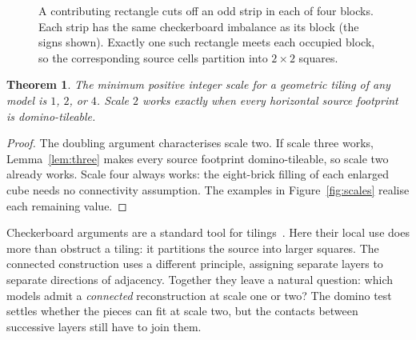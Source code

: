 \documentclass[10pt,reqno]{amsart}
\newtheorem{theorem}{Theorem}
\begin{document}
\begin{figure}[htbp]
\centering
{}
\caption{A contributing rectangle cuts off an odd strip in each of four
blocks. Each strip has the same checkerboard imbalance as its block
(the signs shown). Exactly one such rectangle meets each occupied block,
so the corresponding source cells partition into $2\times2$ squares.}
\label{fig:checkerboard}
\end{figure}

\begin{theorem}\label{thm:scales}
The minimum positive integer scale for a geometric tiling of any model
is $1$, $2$, or $4$. Scale $2$ works exactly when every horizontal
source footprint is domino-tileable.
\end{theorem}

\begin{proof}
The doubling argument characterises scale two. If scale three works,
Lemma~\ref{lem:three} makes every source footprint domino-tileable,
so scale two already works. Scale four always works: the eight-brick
filling of each enlarged cube needs no connectivity assumption.
The examples in Figure~\ref{fig:scales} realise each remaining value.
\end{proof}

Checkerboard arguments are a standard tool for tilings~\cite{Golomb1994}.
Here their local use does more than obstruct a tiling: it partitions the
source into larger squares. The connected construction uses a different
principle, assigning separate layers to separate directions of adjacency.
Together they leave a natural question: which models admit a
\emph{connected} reconstruction at scale one or two? The domino test
settles whether the pieces can fit at scale two, but the contacts between
successive layers still have to join them.
\end{document}
